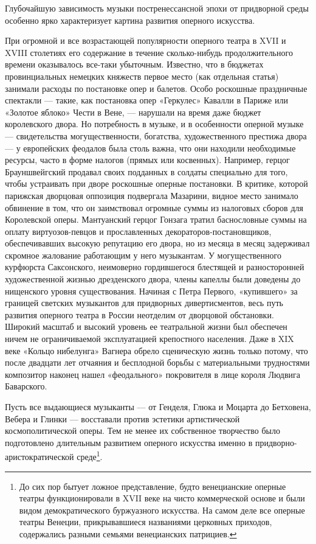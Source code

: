 Глубочайшую  зависимость музыки  постренессансной эпохи  от придворной
среды особенно ярко характеризует картина развития оперного искусства.

При  огромной  и  все  возрастающей  популярности  оперного  театра  в
XVII  и  XVIII  столетиях  его  содержание  в  течение  сколько-нибудь
продолжительного  времени  оказывалось все-таки  убыточным.  Известно,
что  в бюджетах  провинциальных  немецких княжеств  первое место  (как
отдельная  статья)  занимали расходы  по  постановке  опер и  балетов.
Особо  роскошные  праздничные  спектакли  ---  такие,  как  постановка
опер  «Геркулес»  Кавалли  в  Париже  или  «Золотое  яблоко»  Чести  в
Вене,  ---  нарушали  на  время даже  бюджет  королевского  двора.  Но
потребность в музыке, и в особенности оперной музыке --- свидетельства
могущественности,  богатства,  художественного  престижа двора  ---  у
европейских феодалов  была столь  важна, что они  находили необходимые
ресурсы,  часто  в форме  налогов  (прямых  или косвенных).  Например,
герцог Брауншвейгский  продавал своих  подданных в  солдаты специально
для того, чтобы  устраивать при дворе роскошные  оперные постановки. В
критике,  которой парижская  дворцовая оппозиция  подвергала Мазарини,
видное место  занимало обвинение  в том,  что он  заимствовал огромные
суммы  из   налоговых  сборов   для  Королевской   оперы.  Мантуанский
герцог Гонзага  тратил баснословные  суммы на  оплату виртуозов-певцов
и  прославленных   декораторов-постановщиков,  обеспечивавших  высокую
репутацию  его  двора,  но  из  месяца  в  месяц  задерживал  скромное
жалование работающим  у него  музыкантам. У  могущественного курфюрста
Саксонского,  неимоверно   гордившегося  блестящей   и  разносторонней
художественной   жизнью  дрезденского   двора,   члены  капеллы   были
доведены  до   нищенского  уровня   существования.  Начиная   с  Петра
Первого, «купившего»  за границей  светских музыкантов  для придворных
дивертисментов, весь путь развития  оперного театра в России неотделим
от  дворцовой  обстановки.  Широкий   масштаб  и  высокий  уровень  ее
театральной жизни был обеспечен  ничем не ограничиваемой эксплуатацией
крепостного  населения. Даже  в  XIX веке  «Кольцо нибелунга»  Вагнера
обрело  сценическую  жизнь  только  потому,  что  после  двадцати  лет
отчаяния и  бесплодной борьбы  с материальными  трудностями композитор
наконец  нашел   «феодального»  покровителя  в  лице   короля  Людвига
Баварского.

Пусть  все  выдающиеся  музыканты  --- от  Генделя,  Глюка  и  Моцарта
до  Бетховена,   Вебера  и  Глинки  ---   восставали  против  эстетики
артистической  космополитической оперы.  Тем не  менее их  собственное
творчество было  подготовлено длительным развитием  оперного искусства
именно   в  придворно-аристократической   среде\footnote{До  сих   пор
бытует  ложное   представление,  будто  венецианские   оперные  театры
функционировали  в  XVII веке  на  чисто  коммерческой основе  и  были
видом  демократического  буржуазного  искусства.  На  самом  деле  все
оперные театры Венеции,  прикрывавшиеся названиями церковных приходов,
содержались разными семьями венецианских патрициев.}.

